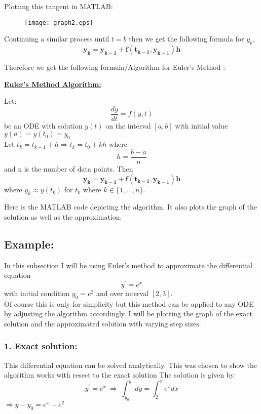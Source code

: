 \documentclass[11pt,a4paper]{amsart}
\begin{document}
	Plotting this tangent in MATLAB:
	\begin{figure}[h]
		\texttt{[image: graph2.eps]}
	\end{figure}

	Continuing a similar process until $t=b$ then we get the following formula for $y_k$,
	$$\boldsymbol{y_k = y_{k-1} + f(t_{k-1}, y_{k-1})h}$$
	
	\vspace{2px}
	Therefore we get the following formula/Algorithm for Euler's Method \cite{burden}:
	\begin{tcolorbox}
		\begin{center}
		\underline{\textbf{Euler's Method Algorithm:}}
		\end{center}
	Let:
	$$\frac{dy}{dt} = f(y,t)$$
	be an ODE with solution $y(t)$ on the interval $[a,b]$ with initial value $y(a) = y(t_0) = y_0$\\
	Let $\displaystyle t_k = t_{k-1} + h  \Rightarrow t_k = t_0 + kh$ where $$\displaystyle h = \frac{b-a}{n}$$ and n is the number of data points. Then
	$$\boldsymbol{y_k = y_{k-1} + f(t_{k-1}, y_{k-1})h}$$
	where $y_k \approx y(t_k)$ for $t_k$ where $k \in \{1, \ldots, n\}$.
	
	
	\end{tcolorbox}
	
	Here is the MATLAB code depicting the algorithm. It also plots the graph of the solution as well as the approximation.
	
	

\subsection{Example:}In this subsection I will be using Euler's method to approximate the differential equation 
$$y^{'} = e^x$$
with initial condition $y_0 = e^2$ and over interval $[2,3]$.\\
Of course this is only for simplicity but this method can be applied to any ODE by adjusting the algorithm accordingly. I will be plotting the graph of the exact solution and the approximated solution with varying step sizes.\\

\subsubsection*{1. Exact solution:} This differential equation can be solved analytically. This was chosen to show the algorithm works with resect to the exact solution The solution is given by:
$$y^{'} = e^{x} \ \Rightarrow \ \int^{y}_{y_0}dy = \int_{2}^{x}e^x dx$$
\vspace{5px}
\hspace{195px} $\displaystyle \Rightarrow y - y_0 = e^x - e^2$
\end{document}
